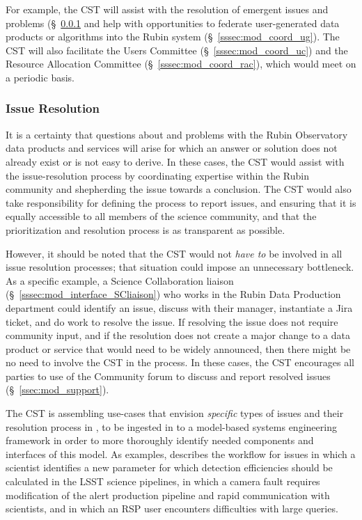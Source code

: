 \documentclass[DM,authoryear,toc]{lsstdoc}
\begin{document}
For example, the CST will assist with the resolution of emergent issues and problems (\S~\ref{sssec:mod_coord_res} and help with opportunities to federate user-generated data products or algorithms into the Rubin system (\S~\ref{sssec:mod_coord_ug}).
The CST will also facilitate the Users Committee (\S~\ref{sssec:mod_coord_uc}) and the Resource Allocation Committee (\S~\ref{sssec:mod_coord_rac}), which would meet on a periodic basis.


\subsubsection{Issue Resolution}\label{sssec:mod_coord_res}

It is a certainty that questions about and problems with the Rubin Observatory data products and services will arise for which an answer or solution does not already exist or is not easy to derive. 
In these cases, the CST would assist with the issue-resolution process by coordinating expertise within the Rubin community and shepherding the issue towards a conclusion.
The CST would also take responsibility for defining the process to report issues, and ensuring that it is equally accessible to all members of the science community, and that the prioritization and resolution process is as transparent as possible.

However, it should be noted that the CST would not \textit{have to} be involved in all issue resolution processes; that situation could impose an unnecessary bottleneck.
As a specific example, a Science Collaboration liaison (\S~\ref{sssec:mod_interface_SCliaison}) who works in the Rubin Data Production department could identify an issue, discuss with their manager, instantiate a Jira ticket, and do work to resolve the issue.
If resolving the issue does not require community input, and if the resolution does not create a major change to a data product or service that would need to be widely announced, then there might be no need to involve the CST in the process.
In these cases, the CST encourages all parties to use of the Community forum to discuss and report resolved issues (\S~\ref{ssec:mod_support}).

The CST is assembling use-cases that envision \textit{specific} types of issues and their resolution process in , to be ingested in to a model-based systems engineering framework in order to more thoroughly identify needed components and interfaces of this model.
As examples,  describes the workflow for issues in which a scientist identifies a new parameter for which detection efficiencies should be calculated in the LSST science pipelines, in which a camera fault requires modification of the alert production pipeline and rapid communication with scientists, and in which an RSP user encounters difficulties with large queries. 
\end{document}
